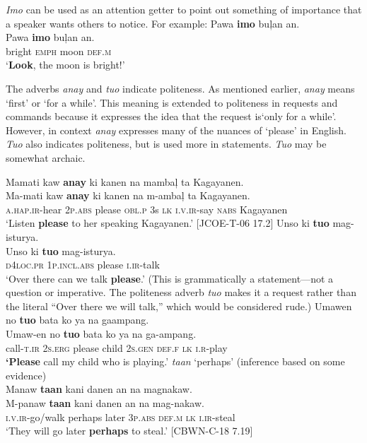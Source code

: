 \textit{Imo} can be used as an attention getter to point out something of importance that a speaker wants others to notice. For example:
\ea
Pawa  \textbf{imo}  buļan  an. \\\smallskip
 \gll Pawa  \textbf{imo}  buļan  an. \\
bright  \textsc{emph}  moon  \textsc{def.m} \\
\glt ‘\textbf{Look}, the moon is bright!’
\z

\hspace*{-4.1pt}The adverbs \textit{anay} and \textit{tuo} indicate politeness. As mentioned earlier, \textit{anay} means `first' or `for a while'. This meaning is extended to politeness in requests and commands because it expresses the idea that the request is`only for a while'. However, in context \textit{anay} expresses many of the nuances of ‘please’ in English. \textit{Tuo} also indicates politeness, but is used more in statements. \textit{Tuo} may be somewhat archaic.


\ea
Mamati  kaw  \textbf{anay}  ki  kanen  na  mambaļ  ta  Kagayanen. \\\smallskip
 \gll Ma-mati  kaw  \textbf{anay}  ki  kanen  na  m-ambaļ  ta  Kagayanen. \\
\textsc{a.hap.ir}-hear  2\textsc{p.abs}  please  \textsc{obl.p}  3s  \textsc{lk}  \textsc{i.v.ir}-say  \textsc{nabs}  Kagayanen \\
\glt ‘Listen \textbf{please} to her speaking Kagayanen.’ [JCOE-T-06  17.2]
\z
\ea
Unso  ki  \textbf{tuo}  mag-isturya. \\\smallskip
 \gll Unso  ki  \textbf{tuo}  mag-isturya. \\
\textsc{d}4\textsc{loc.pr}  1\textsc{p.incl.abs}  please  \textsc{i.ir}-talk \\
\glt ‘Over there can we talk \textbf{please}.’ (This is grammatically a statement---not a question or imperative. The politeness adverb \textit{tuo} makes it a request rather than the literal “Over there we will talk,” which would be considered rude.)
\z
\ea
Umawen  no  \textbf{tuo}  bata  ko  ya  na  gaampang. \\\smallskip
 \gll Umaw-en  no  \textbf{tuo}  bata  ko  ya  na  ga-ampang. \\
call-\textsc{t.ir}  2\textsc{s.erg}  please  child  2\textsc{s.gen}  \textsc{def.f}  \textsc{lk}  \textsc{i.r}-play \\
\glt \textbf{‘Please} call my child who is playing.’
\z
\ea
\textit{taan} ‘perhaps’ (inference based on some evidence) \\
Manaw  \textbf{taan}  kani  danen  an  na  magnakaw. \\\smallskip
 \gll M-panaw  \textbf{taan}  kani  danen  an  na  mag-nakaw. \\
\textsc{i.v.ir}-go/walk  perhaps  later  3\textsc{p.abs}  \textsc{def.m}  \textsc{lk}  \textsc{i.ir}-steal \\
\glt ‘They will go later \textbf{perhaps} to steal.’ [CBWN-C-18 7.19]
\z

